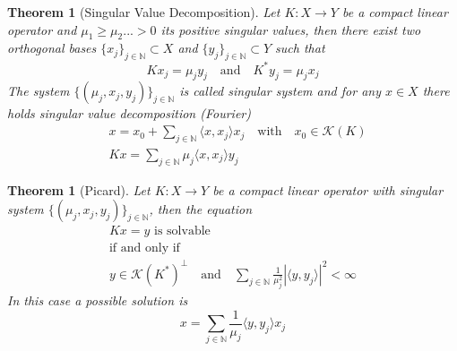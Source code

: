 \documentclass[10pt, a4paper, twoside, openright]{book}
\theoremstyle{definition}
\theoremstyle{plain}
\newtheorem{theorem}[subsection]{Theorem}
\theoremstyle{plain}
\theoremstyle{plain}
\theoremstyle{plain}
\theoremstyle{plain}
\theoremstyle{plain}
\theoremstyle{plain}
\theoremstyle{plain}
\begin{document}
\begin{theorem}[Singular Value Decomposition]
Let $K: X\to Y$ be a compact linear operator and $\mu_1\geq\mu_2...>0$ its positive singular values, then there exist two orthogonal bases $\{x_j\}_{j \in \mathbb{N}}\subset X$ and $\{y_j\}_{j \in \mathbb{N}}\subset Y$ such that
\begin{equation}
 Kx_j = \mu_j y_j \quad \text{and}\quad K^* y_j = \mu_j x_j
\end{equation}
The system $\{(\mu_j,x_j,y_j)\}_{j \in \mathbb{N}}$ is called singular system and for any $x \in X$ there holds singular value decomposition (Fourier)
\begin{align}
 & x = x_0 + \sum_{j \in \mathbb{N}} \langle x, x_j \rangle x_j\quad \text{with}\quad x_0 \in \mathcal{K}(K) \\
 & Kx = \sum_{j \in \mathbb{N}} \mu_j \langle x, x_j \rangle y_j
\end{align}
\end{theorem}

\begin{theorem}[Picard]
Let $K: X \to Y$ be a compact linear operator with singular system $\{(\mu_j,x_j,y_j)\}_{j \in \mathbb{N}}$, then the equation
\begin{gather}
 Kx = y \,\,\text{is solvable}\\
 \text{if and only if}\\
 y \in \mathcal{K}(K^*)^\perp\quad\text{and} \quad \sum_{j \in \mathbb{N}}\frac{1}{\mu_j^2}|\langle y,y_j\rangle|^2< \infty
\end{gather}
In this case a possible solution is
\begin{equation}
 x = \sum_{j \in \mathbb{N}}\frac{1}{\mu_j}\langle y,y_j\rangle x_j
\end{equation}
\end{theorem}



\end{document}
